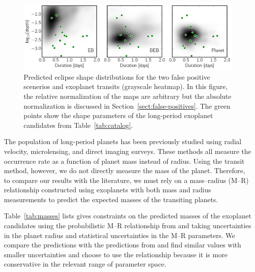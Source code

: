 \documentclass[manuscript, letterpaper]{aastex6}
\makeatletter
\let\origsection\section
\renewcommand\section{\@ifstar{\starsection}{\nostarsection}}
\newcommand\nostarsection[1]{\sectionprelude\origsection{#1}}
\newcommand\starsection[1]{\sectionprelude\origsection*{#1}}
\newcommand\sectionprelude{\vspace{1em}}
\newcommand{\dfmfiglabel}[1]{\label{fig:#1}}
\newcommand{\sectionname}{Section}
\newcommand{\sectref}[1]{\ref{sect:#1}}
\newcommand{\Sect}[1]{\sectionname~\sectref{#1}}
\newcommand{\sect}[1]{\Sect{#1}}
\newcommand{\sectlabel}[1]{\label{sect:#1}}
\makeatother
\begin{document}
\begin{figure}[htbp]~\\
\begin{center}
\includegraphics[width=\textwidth]{../prediction/shape_kdes.pdf}
\end{center}
\caption{%
Predicted eclipse shape distributions for the two false positive scenerios and
exoplanet transits (grayscale heatmap).
In this figure, the relative normalization of the maps are arbitrary but the
absolute normalization is discussed in \sect{false-positives}.
The green points show the shape parameters of the long-period exoplanet
candidates from Table~\ref{tab:catalog}.
\dfmfiglabel{shape-kdes}}
\end{figure}


\section{Comparison with the literature}\sectlabel{comparison}

The population of long-period planets has been previously studied using radial
velocity, microlensing, and direct imaging surveys.
These methods all measure the occurrence rate as a function of planet mass
instead of radius.
Using the transit method, however, we do not directly measure the mass of the
planet.
Therefore, to compare our results with the literature, we must rely on a
mass--radius (M--R) relationship constructed using exoplanets with both mass
and radius measurements \citep[for example][]{Weiss:2014, Wolfgang:2016,
Chen:2016} to predict the expected masses of the transiting planets.

Table~\ref{tab:masses} lists gives constraints on the predicted masses of the
exoplanet candidates using the probabilistic M--R relationship from
\citet{Chen:2016} and taking uncertainties in the planet radius and
statistical uncertainties in the M--R parameters.
We compare the predictions with the predictions from \citet{Wolfgang:2016} and
find similar values with smaller uncertainties and choose to use the
\citet{Chen:2016} relationship because it is more conservative in the relevant
range of parameter space.
\end{document}
